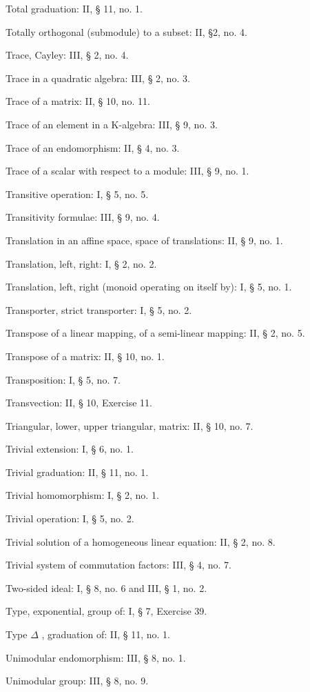 Total graduation: II, § 11, no. 1.

Totally orthogonal (submodule) to a subset: II, §2, no. 4.

Trace, Cayley: III, § 2, no. 4.

Trace in a quadratic algebra: III, § 2, no. 3.

Trace of a matrix: II, § 10, no. 11.

Trace of an element in a K-algebra: III, § 9, no. 3.

Trace of an endomorphism: II, § 4, no. 3.

Trace of a scalar with respect to a module: III, § 9, no. 1.

Transitive operation: I, § 5, no. 5.

Transitivity formulae: III, § 9, no. 4.

Translation in an affine space, space of translations: II, § 9, no. 1.

Translation, left, right: I, § 2, no. 2.

Translation, left, right (monoid operating on itself by): I, § 5, no. 1.

Transporter, strict transporter: I, § 5, no. 2.

Transpose of a linear mapping, of a semi-linear mapping: II, § 2, no. 5.

Transpose of a matrix: II, § 10, no. 1.

Transposition: I, § 5, no. 7.

Transvection: II, § 10, Exercise 11.

Triangular, lower, upper triangular, matrix: II, § 10, no. 7.

Trivial extension: I, § 6, no. 1.

Trivial graduation: II, § 11, no. 1.

Trivial homomorphism: I, § 2, no. 1.

Trivial operation: I, § 5, no. 2.

Trivial solution of a homogeneous linear equation: II, § 2, no. 8.

Trivial system of commutation factors: III, § 4, no. 7.

Two-sided ideal: I, § 8, no. 6 and III, § 1, no. 2.

Type, exponential, group of: I, § 7, Exercise 39.

Type \(\Delta\) , graduation of: II, § 11, no. 1.

Unimodular endomorphism: III, § 8, no. 1.

Unimodular group: III, § 8, no. 9.

